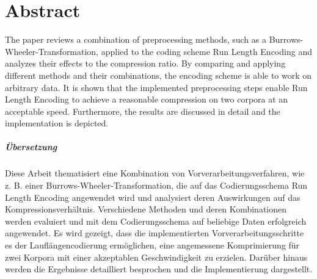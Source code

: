 \chapter*{Abstract}
The paper reviews a combination of preprocessing methods, such as a Burrows-Wheeler-Transformation, applied to the coding scheme Run Length Encoding and analyzes their effects to the compression ratio. By comparing and applying different methods and their combinations, the encoding scheme is able to work on arbitrary data. It is shown that the implemented preprocessing steps enable Run Length Encoding to achieve a reasonable compression on two corpora at an acceptable speed. Furthermore, the results are discussed in detail and the implementation is depicted.

\paragraph{Übersetzung}
Diese Arbeit thematisiert eine Kombination von Vorverarbeitungsverfahren, wie z. B. einer Burrows-Wheeler-Transformation, die auf das Codierungsschema Run Length Encoding angewendet wird und analysiert deren Auswirkungen auf das Kompressionsverhältnis. Verschiedene Methoden und deren Kombinationen werden evaluiert und mit dem Codierungsschema auf beliebige Daten erfolgreich angewendet. Es wird gezeigt, dass die implementierten Vorverarbeitungsschritte es der Lauflängencodierung ermöglichen, eine angemessene Komprimierung für zwei Korpora mit einer akzeptablen Geschwindigkeit zu erzielen. Darüber hinaus werden die Ergebnisse detailliert besprochen und die Implementierung dargestellt.